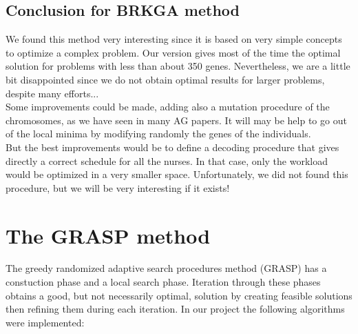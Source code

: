 \documentclass[11pt]{article}
\begin{document}
\subsection{Conclusion for BRKGA method}
We found this method very interesting since it is based on very simple concepts to optimize a complex problem. Our version gives most of the time the optimal solution for problems with less than about 350 genes. Nevertheless, we are a little bit disappointed since we do not obtain optimal results for larger problems, despite many efforts...  \\
Some improvements could be made, adding also a mutation procedure of the chromosomes, as we have seen in many AG papers. It will may be help to go out of the local minima by modifying  randomly the genes of the individuals. \\
But the best improvements would be to define a decoding procedure that gives directly a correct schedule for all the nurses. In that case, only the workload would be optimized in a very smaller space. Unfortunately, we did not found this procedure, but we will be very interesting if it exists!



\section{The GRASP method}
The greedy randomized adaptive search procedures method (GRASP) has a constuction phase and a local search phase. Iteration through these phases obtains a good, but not necessarily optimal, solution by creating feasible solutions then refining them during each iteration.
In our project the following algorithms were implemented:\\
\end{document}
